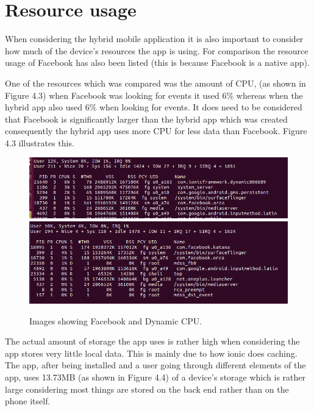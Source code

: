  \section{Resource usage}
 When considering the hybrid mobile application it is also important to consider how much of the device's resources the app is using. For comparison the resource usage of Facebook has also been listed (this is because Facebook is a native app).

 One of the resources which was compared was the amount of CPU, (as shown in Figure 4.3) when Facebook was looking for events it used 6\% whereas when the hybrid app also used 6\% when looking for events. It does need to be considered that Facebook is significantly larger than the hybrid app which was created consequently the hybrid app uses more CPU for less data than Facebook. Figure 4.3 illustrates this.

\begin{figure}[H]
\includegraphics[scale=0.45]{images/ram2}
\includegraphics[scale=0.45]{images/ram3}
\caption{Images showing Facebook and Dynamic CPU.}
\end{figure}

The actual amount of storage the app uses is rather high when considering the app stores very little local data. This is mainly due to how ionic does caching. The app, after being installed and a user going through different elements of the app, uses 13.73MB (as shown in Figure 4.4) of a device's storage which is rather large considering most things are stored on the back end rather than on the phone itself. 

